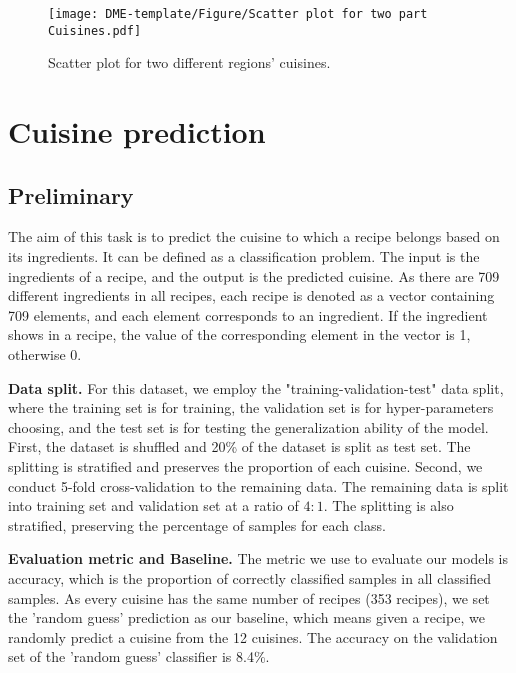 \documentclass{article}
\begin{document}
\begin{figure}[ht]
\vskip -1mm
\centering
\texttt{[image: DME-template/Figure/Scatter plot for two part Cuisines.pdf]}
\vskip -3mm
\caption{Scatter plot for two different regions' cuisines.}
\label{fig:Scatter plot for two part Cuisines} 
\vskip -5mm
\end{figure}

\section{Cuisine prediction}

\subsection{Preliminary}
The aim of this task is to predict the cuisine to which a recipe belongs based on its ingredients. It can be defined as a classification problem. The input is the ingredients of a recipe, and the output is the predicted cuisine. As there are 709 different ingredients in all recipes, each recipe is denoted as a vector containing 709 elements, and each element corresponds to an ingredient. If the ingredient shows in a recipe, the value of the corresponding element in the vector is 1, otherwise 0. 

\textbf{Data split.}
For this dataset, we employ the "training-validation-test" data split, where the training set is for training, the validation set is for hyper-parameters choosing, and the test set is for testing the generalization ability of the model. First, the dataset is shuffled and 20\% of the dataset is split as test set. The splitting is stratified and preserves the proportion of each cuisine. Second, we conduct 5-fold cross-validation to the remaining data. The remaining data is split into training set and validation set at a ratio of $4:1$. The splitting is also stratified, preserving the percentage of samples for each class. 

\textbf{Evaluation metric and Baseline.}
The metric we use to evaluate our models is accuracy, which is the proportion of correctly classified samples in all classified samples. As every cuisine has the same number of recipes (353 recipes), we set the 'random guess' prediction as our baseline, which means given a recipe, we randomly predict a cuisine from the 12 cuisines. The accuracy on the validation set of the 'random guess' classifier is 8.4\%.
\end{document}
